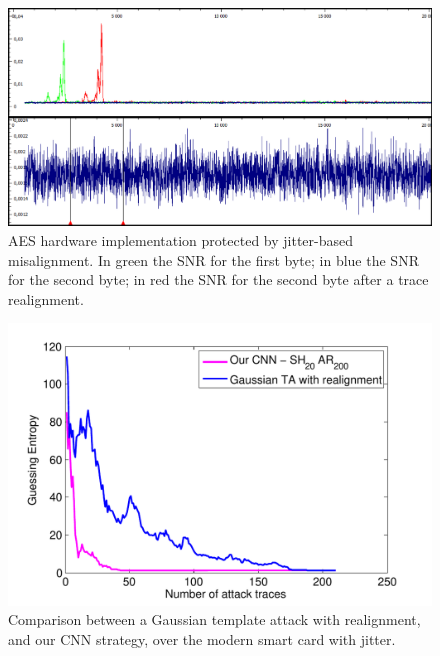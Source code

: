 \begin{figure}
    \centering
    \includegraphics[width=\textwidth]{../Figures/CHES2017/snrs.png} 
     \caption[SNR values for an AES hardware implementation protected by jitter-based misalignment.]{AES hardware implementation protected by jitter-based misalignment. In green the SNR for the first byte; in blue the SNR for the second byte; in red the SNR for the second byte after a trace realignment.}\label{fig:SNR}
\end{figure}


\begin{figure}
    \centering
    \includegraphics[width=\textwidth]{../Figures/CHES2017/TA_CNN_smartcard.pdf} 
     \caption{Comparison between a Gaussian template attack with realignment, and our CNN strategy, over the modern smart card with jitter.}\label{fig:TA_smartcard}
\end{figure}

%

